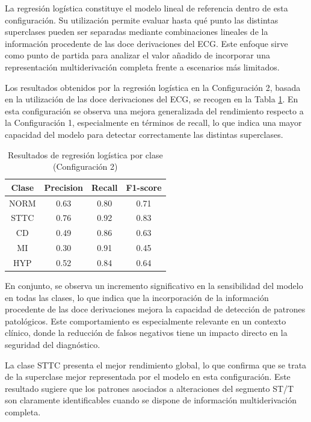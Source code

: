\documentclass[12pt,a4paper,twoside]{book}
\begin{document}
La regresión logística constituye el modelo lineal de referencia dentro de esta configuración. 
Su utilización permite evaluar hasta qué punto las distintas superclases pueden ser separadas mediante combinaciones lineales de la información procedente de las doce derivaciones del ECG. 
Este enfoque sirve como punto de partida para analizar el valor añadido de incorporar una representación multiderivación completa frente a escenarios más limitados.

\vspace{0.5cm}

Los resultados obtenidos por la regresión logística en la Configuración 2, basada en la utilización de las doce derivaciones del ECG, se recogen en la Tabla \ref{tab:metrics_clase_lr_feat12}. 
En esta configuración se observa una mejora generalizada del rendimiento respecto a la Configuración 1, especialmente en términos de recall, lo que indica una mayor capacidad del modelo para detectar correctamente las distintas superclases.

\begin{table}[H]
	\centering
	\begin{tabular}{|c|c|c|c|}
	\hline
	\textbf{Clase} & \textbf{Precision} & \textbf{Recall} & \textbf{F1-score} \\
	\hline
	NORM & 0.63 & 0.80 & 0.71 \\
	STTC & 0.76 & 0.92 & 0.83 \\
	CD   & 0.49 & 0.86 & 0.63 \\
	MI   & 0.30 & 0.91 & 0.45 \\
	HYP  & 0.52 & 0.84 & 0.64 \\
	\hline
	\end{tabular}
	\caption{Resultados de regresión logística por clase (Configuración 2)}
	\label{tab:metrics_clase_lr_feat12}
\end{table}

En conjunto, se observa un incremento significativo en la sensibilidad del modelo en todas las clases, lo que indica que la incorporación de la información procedente de las doce derivaciones mejora la capacidad de detección de patrones patológicos. 
Este comportamiento es especialmente relevante en un contexto clínico, donde la reducción de falsos negativos tiene un impacto directo en la seguridad del diagnóstico.

La clase STTC presenta el mejor rendimiento global, lo que confirma que se trata de la superclase mejor representada por el modelo en esta configuración. 
Este resultado sugiere que los patrones asociados a alteraciones del segmento ST/T son claramente identificables cuando se dispone de información multiderivación completa.
\end{document}
